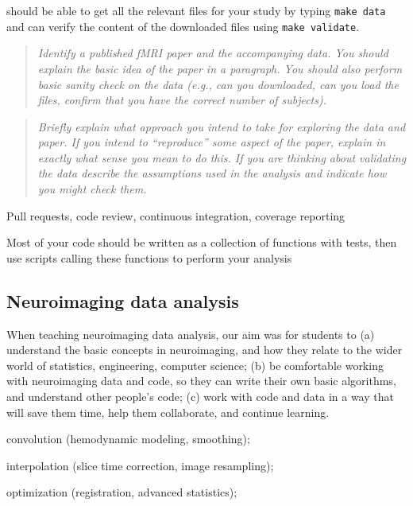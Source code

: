 should be able to get all the relevant files for your study by typing \texttt{make data} and
can verify the content of the downloaded files using \texttt{make validate}.


\begin{quote}\emph{
Identify a published fMRI paper and the accompanying data.
You should explain the basic idea of the paper in a paragraph.
You should also perform basic sanity check on the data
(e.g., can you downloaded, can you load the files, confirm that you have the
correct number of subjects).
}\end{quote}

\begin{quote}\emph{
Briefly explain what approach you intend to take for exploring
the data and paper.  If you intend to ``reproduce'' some aspect of the paper,
explain in exactly what sense you mean to do this.  If you are thinking about
validating the data describe the assumptions used in the analysis and indicate
how you might check them.
}\end{quote}

Pull requests, code review, continuous integration, coverage reporting

Most of your code should be written as a collection of functions with tests,
then use scripts calling these functions to perform your analysis




\subsection{Neuroimaging data analysis}\label{analysis}

When teaching neuroimaging data analysis, our aim was for students to
(a) understand the basic concepts in neuroimaging,
and how they relate to the wider world of statistics, engineering, computer science;
(b) be comfortable working with neuroimaging data and code,
so they can write their own basic algorithms, and understand other people's code;
(c) work with code and data in a way that will save them time, help them collaborate,
and continue learning.%


convolution (hemodynamic modeling, smoothing);

interpolation (slice time correction, image resampling);

optimization (registration, advanced statistics);

